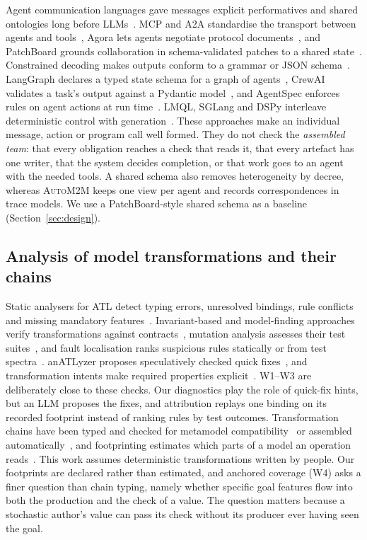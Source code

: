 \documentclass[pdflatex,sn-mathphys-num]{sn-jnl}
\theoremstyle{thmstyleone}%
\theoremstyle{thmstyletwo}%
\theoremstyle{thmstylethree}%
\newcommand{\auto}{\textsc{AutoM2M}}
\newcommand{\W}[1]{\textsf{W#1}}
\begin{document}
Agent communication languages gave messages explicit performatives and shared
ontologies long before LLMs~\cite{finin1994kqml}. MCP and A2A standardise the
transport between agents and tools~\cite{mcp2024,a2a2025}, Agora lets agents
negotiate protocol documents~\cite{marro2024agora}, and PatchBoard grounds
collaboration in schema-validated patches to a shared
state~\cite{zhang2026patchboard}. Constrained decoding makes outputs conform to
a grammar or JSON schema~\cite{willard2023outlines}. LangGraph declares a typed
state schema for a graph of agents~\cite{langgraph2025}, CrewAI validates a
task's output against a Pydantic model~\cite{crewai2025}, and AgentSpec enforces
rules on agent actions at run time~\cite{wang2026agentspec}. LMQL, SGLang and
DSPy interleave deterministic control with
generation~\cite{beurerkellner2023lmql,zheng2024sglang,khattab2024dspy}. These
approaches make an individual message, action or program call well formed. They
do not check the \emph{assembled team}: that every obligation reaches a check
that reads it, that every artefact has one writer, that the system decides
completion, or that work goes to an agent with the needed tools. A shared schema
also removes heterogeneity by decree, whereas \auto{} keeps one view per agent
and records correspondences in trace models. We use a PatchBoard-style shared
schema as a baseline (Section~\ref{sec:design}).

\subsection{Analysis of model transformations and their chains}\label{sec:rw-mt}

Static analysers for ATL detect typing errors, unresolved bindings, rule
conflicts and missing mandatory features~\cite{cuadrado2017static}.
Invariant-based and model-finding approaches verify transformations against
contracts~\cite{cabot2010invariants,rahim2015survey}, mutation analysis assesses
their test suites~\cite{mottu2006mutation}, and fault localisation ranks
suspicious rules statically or from test
spectra~\cite{burgueno2015static,troya2018sbfl,troya2022survey}. anATLyzer
proposes speculatively checked quick fixes~\cite{cuadrado2018quickfix}, and
transformation intents make required properties
explicit~\cite{lucio2016intents}. \W{1}--\W{3} are deliberately close to these
checks. Our diagnostics play the role of quick-fix hints, but an LLM proposes the
fixes, and attribution replays one binding on its recorded footprint instead of
ranking rules by test outcomes. Transformation chains have been typed and
checked for metamodel compatibility~\cite{vanhooff2007uniti} or assembled
automatically~\cite{basciani2014chaining}, and footprinting estimates which
parts of a model an operation reads~\cite{jeanneret2011footprints}. This work
assumes deterministic transformations written by people. Our footprints are
declared rather than estimated, and anchored coverage (\W{4}) asks a finer
question than chain typing, namely whether specific goal features flow into
both the production and the check of a value. The question matters because a
stochastic author's value can pass its check without its producer ever having
seen the goal.
\end{document}
